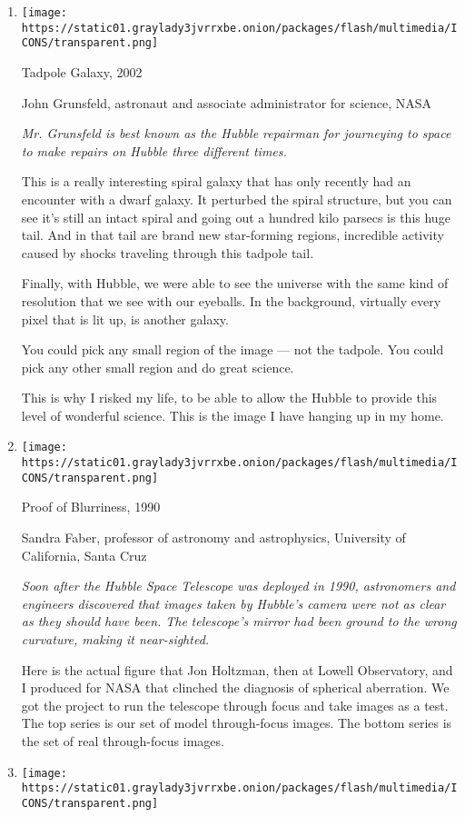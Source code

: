 \begin{enumerate}
\def\labelenumi{\arabic{enumi}.}
\item
  \texttt{[image: https://static01.graylady3jvrrxbe.onion/packages/flash/multimedia/ICONS/transparent.png]}

  Tadpole Galaxy, 2002

  John Grunsfeld, astronaut and associate administrator for science,
  NASA

  \emph{Mr. Grunsfeld is best known as the Hubble repairman for
  journeying to space to make repairs on Hubble three different times.}

  This is a really interesting spiral galaxy that has only recently had
  an encounter with a dwarf galaxy. It perturbed the spiral structure,
  but you can see it's still an intact spiral and going out a hundred
  kilo parsecs is this huge tail. And in that tail are brand new
  star-forming regions, incredible activity caused by shocks traveling
  through this tadpole tail.

  Finally, with Hubble, we were able to see the universe with the same
  kind of resolution that we see with our eyeballs. In the background,
  virtually every pixel that is lit up, is another galaxy.

  You could pick any small region of the image --- not the tadpole. You
  could pick any other small region and do great science.

  This is why I risked my life, to be able to allow the Hubble to
  provide this level of wonderful science. This is the image I have
  hanging up in my home.
\item
  \texttt{[image: https://static01.graylady3jvrrxbe.onion/packages/flash/multimedia/ICONS/transparent.png]}

  Proof of Blurriness, 1990

  Sandra Faber, professor of astronomy and astrophysics, University of
  California, Santa Cruz

  \emph{Soon after the Hubble Space Telescope was deployed in 1990,
  astronomers and engineers discovered that images taken by Hubble's
  camera were not as clear as they should have been. The}
  \emph{telescope's mirror had been ground to the wrong curvature,
  making it near-sighted.}

  Here is the actual figure that Jon Holtzman, then at Lowell
  Observatory, and I produced for NASA that clinched the diagnosis of
  spherical aberration. We got the project to run the telescope through
  focus and take images as a test. The top series is our set of model
  through-focus images. The bottom series is the set of real
  through-focus images.
\item
  \texttt{[image: https://static01.graylady3jvrrxbe.onion/packages/flash/multimedia/ICONS/transparent.png]}


\end{enumerate}
